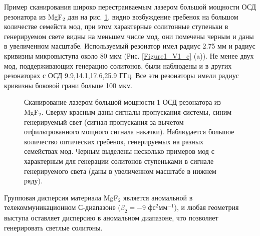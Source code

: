 Пример сканирования широко перестраиваемым лазером большой мощности ОСД резонатора из MgF$_2$ дан на рис. \ref{Scan_SolitonSpot}, видно возбуждение гребенок на большом количестве семейств мод, при этом характерные солитонные ступеньки в генерируемом свете видны на меньшем числе мод, они помечены черным и даны в увеличенном масштабе. Используемый резонатор имел радиус  2.75 мм и радиус кривизны микровыступа около 80 мкм (Рис. \ref{Figure1_V1_c} (a)). Не менее двух мод, поддерживающих генерацию солитонов, были наблюдены и в других резонаторах с ОСД 9.9,14.1,17.6,25.9 ГГц. Все эти резонаторы имели радиус кривизны боковой грани больше 100 мкм.

\begin{figure}[!htb]
\begin{minipage}{1\linewidth}
\end{minipage}
\caption{Сканирование лазером большой мощности 1 ОСД резонатора из MgF$_2$. Сверху красным даны сигналы пропускания системы, синим - генерируемый свет (сигнал пропускания за вычетом отфильтрованного мощного сигнала накачки). Наблюдается большое количество оптических гребенок, генерируемых на разных семействах мод. Черным выделены несколько примеров мод с характерным для генерации солитонов ступеньками в сигнале генерируемого света (даны в увеличенном масштабе в нижнем ряду).}
\label{Scan_SolitonSpot}
\end{figure}

Групповая дисперсия материала MgF$_2$ является аномальной в телекоммуникационном С-диапазоне ($\beta_2=-9$ фс$^2$мм$^{-1}$), и любая геометрия выступа оставляет дисперсию в аномальном диапазоне, что позволяет генерировать светлые солитоны.

